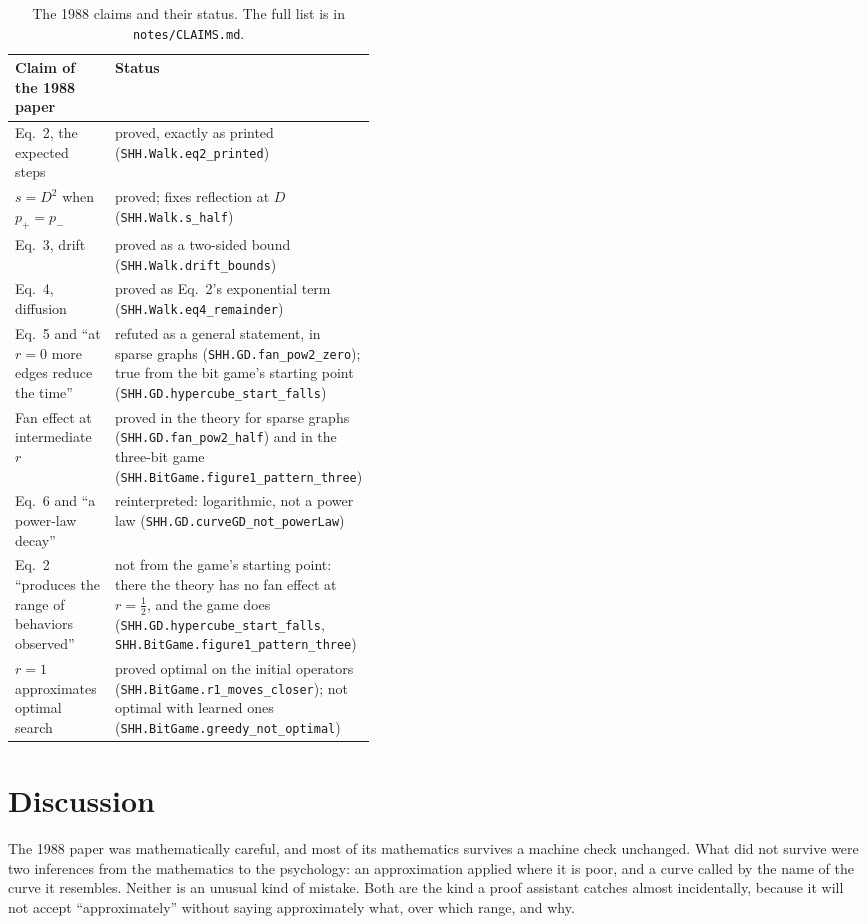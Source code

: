 \documentclass[11pt]{article}
\newcommand{\lean}[1]{\texttt{#1}}
\newcommand{\code}[1]{\texttt{#1}}
\begin{document}
\begin{table}[t]
\centering\small
\begin{tabularx}{\linewidth}{@{}>{\raggedright\arraybackslash}p{0.42\linewidth}>{\raggedright\arraybackslash}X@{}}
\toprule
Claim of the 1988 paper & Status \\
\midrule
Eq.~2, the expected steps & proved, exactly as printed (\lean{SHH.Walk.eq2\_printed}) \\
$s = D^2$ when $p_+ = p_-$ & proved; fixes reflection at $D$ (\lean{SHH.Walk.s\_half}) \\
Eq.~3, drift & proved as a two-sided bound (\lean{SHH.Walk.drift\_bounds}) \\
Eq.~4, diffusion & proved as Eq.~2's exponential term (\lean{SHH.Walk.eq4\_remainder}) \\
Eq.~5 and ``at $r = 0$ more edges reduce the time'' & refuted as a general statement, in sparse graphs (\lean{SHH.GD.fan\_pow2\_zero}); true from the bit game's starting point (\lean{SHH.GD.hypercube\_start\_falls}) \\
Fan effect at intermediate $r$ & proved in the theory for sparse graphs (\lean{SHH.GD.fan\_pow2\_half}) and in the three-bit game (\lean{SHH.BitGame.figure1\_pattern\_three}) \\
Eq.~6 and ``a power-law decay'' & reinterpreted: logarithmic, not a power law (\lean{SHH.GD.curveGD\_not\_powerLaw}) \\
Eq.~2 ``produces the range of behaviors observed'' & not from the game's starting point: there the theory has no fan effect at $r = \tfrac12$, and the game does (\lean{SHH.GD.hypercube\_start\_falls}, \lean{SHH.BitGame.figure1\_pattern\_three}) \\
$r = 1$ approximates optimal search & proved optimal on the initial operators (\lean{SHH.BitGame.r1\_moves\_closer}); not optimal with learned ones (\lean{SHH.BitGame.greedy\_not\_optimal}) \\
\bottomrule
\end{tabularx}
\caption{The 1988 claims and their status. The full list is in \code{notes/CLAIMS.md}.}
\label{tab:claims}
\end{table}

\section{Discussion}
\label{sec:disc}

The 1988 paper was mathematically careful, and most of its mathematics
survives a machine check unchanged. What did not survive were two inferences
from the mathematics to the psychology: an approximation applied where it
is poor, and a curve called by the name of the curve it resembles. Neither
is an unusual kind of mistake. Both are the kind a proof assistant catches
almost incidentally, because it will not accept ``approximately'' without
saying approximately what, over which range, and why.
\end{document}
